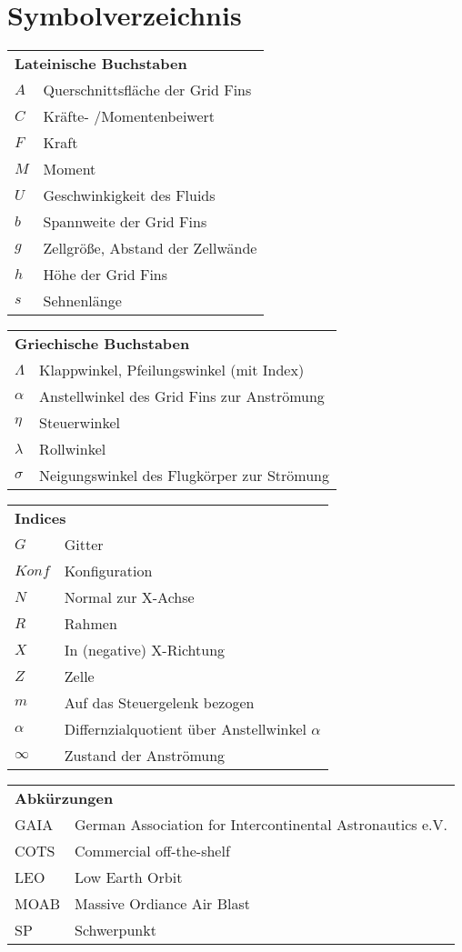 \chapter*{Symbolverzeichnis}						%

\begin{longtable}[l]{ll}
\multicolumn{2}{l}{\textbf{Lateinische Buchstaben}}\\
$A$&Querschnittsfläche der Grid Fins\\
$C$&Kräfte- /Momentenbeiwert\\
$F$&Kraft\\
$M$&Moment\\
$U$&Geschwinkigkeit des Fluids\\
$b$&Spannweite der Grid Fins\\
$g$&Zellgröße, Abstand der Zellwände\\
$h$&Höhe der Grid Fins\\
$s$&Sehnenlänge\\
\end{longtable}


\begin{longtable}[l]{ll}
	\multicolumn{2}{l}{\textbf{Griechische Buchstaben}}\\
	$\Lambda$&Klappwinkel, Pfeilungswinkel (mit Index)\\
	$\alpha$&Anstellwinkel des Grid Fins zur Anströmung\\
	$\eta$&Steuerwinkel\\
	$\lambda$&Rollwinkel\\
	$\sigma$&Neigungswinkel des Flugkörper zur Strömung\\
\end{longtable}

\begin{longtable}[l]{ll}
	\multicolumn{2}{l}{\textbf{Indices}}\\
	$G$&Gitter\\
	$Konf$&Konfiguration\\
	$N$&Normal zur X-Achse\\
	$R$&Rahmen\\
	$X$&In (negative) X-Richtung\\
	$Z$&Zelle\\
	$m$&Auf das Steuergelenk bezogen\\
	$\alpha$&Differnzialquotient über Anstellwinkel $\alpha$\\
	$\infty$&Zustand der Anströmung\\
\end{longtable}

\begin{longtable}[l]{ll}
	\multicolumn{2}{l}{\textbf{Abkürzungen}}\\
	GAIA&German Association for Intercontinental Astronautics e.V.\\
	COTS&Commercial off-the-shelf\\
	LEO&Low Earth Orbit\\
	MOAB&Massive Ordiance Air Blast\\
	SP&Schwerpunkt\\
\end{longtable}